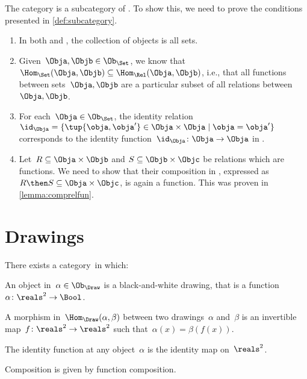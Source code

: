 \begin{example}
    The category \Set is a subcategory of \Rel. To show this, we need to prove the conditions presented in \cref{def:subcategory}.
    \begin{enumerate}
        \item In both \Rel and \Set, the collection of objects is all sets.
        \item Given~$\Obja,\Objb\in \Ob_{\Set}$, we know that~$\Hom_{\Set}(\Obja,\Objb)\subseteq \Hom_{\Rel}(\Obja,\Objb)$, i.e., that all functions between sets~$\Obja,\Objb$ are a particular subset of all relations between~$\Obja,\Objb$.
        \item For each~$\Obja \in \Ob_{\Set}$, the identity relation~$\id_\Obja=\{\tup{\obja,\obja'}\in \Obja\times \Obja \mid \obja=\obja'\}$ corresponds to the identity function~$\id_\Obja \colon \Obja \to \Obja$ in \Set.
        \item Let~$R\subseteq \Obja\times \Objb$ and $S\subseteq \Objb \times \Objc$ be relations which are functions. We need to show that their composition in \Rel, expressed as~$R\then S\subseteq \Obja\times \Objc$, is again a function. This was proven in \cref{lemma:comprelfun}.
    \end{enumerate}

\end{example}


\section{Drawings}

\begin{definition}[Drawings]
    There exists a category~\Draw in which:
    \begin{compactenum}
        \item An object in~$\alpha\in \Ob_\Draw$ is a black-and-white drawing,
        that is a function~$\alpha \colon \reals^2 \to \Bool$.
        \item A morphism in~$\Hom_{\Draw}(\alpha, \beta)$ between two drawings~$\alpha$ and~$\beta$ is an invertible map~$f\colon \reals^2 \to \reals^2$ such that~$\alpha(x) = \beta(f(x))$.
        \item The identity function at any object~$\alpha$ is the identity map
        on~$\reals^2$.
        \item Composition is given by function composition.
    \end{compactenum}
\end{definition}

